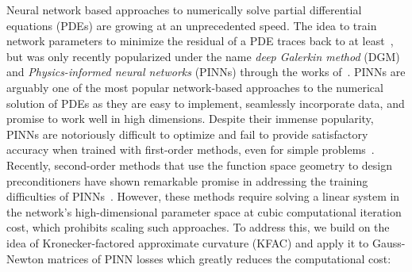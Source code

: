 Neural network based approaches to numerically solve partial differential equations (PDEs) are growing at an unprecedented speed.
The idea to train network parameters to minimize the residual of a PDE traces back to at least~\citet{dissanayake1994neural, lagaris1998artificial}, but was only recently popularized under the name \emph{deep Galerkin method} (DGM) and \emph{Physics-informed neural networks} (PINNs) through the works of~\citet{sirignano2018dgm, raissi2019physics}.
PINNs are arguably one of the most popular network-based approaches to the numerical solution of PDEs as they are easy to implement, seamlessly incorporate data, and promise to work well in high dimensions.
Despite their immense popularity, PINNs are notoriously difficult to optimize \citep{wang2021understanding} and fail to provide satisfactory accuracy when trained with first-order methods, even for simple problems~\citep{zeng2022competitive, muller2023achieving}.
Recently, second-order methods that use the function space geometry to design preconditioners have shown remarkable promise in addressing the training difficulties of PINNs~\citep{zeng2022competitive, muller2023achieving, de2023operator,jnini2024gauss, muller2024optimization}.
However, these methods require solving a linear system in the network's high-dimensional parameter space at cubic computational iteration cost, which prohibits scaling such approaches.
To address this, we build on the idea of Kronecker-factored approximate curvature (KFAC) and apply it to Gauss-Newton matrices of PINN losses which greatly reduces the computational cost:
